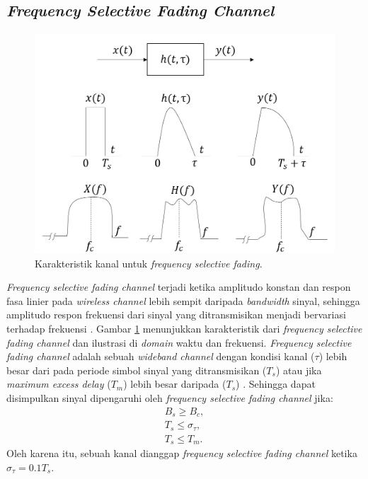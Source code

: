 \subsection{\textit{Frequency Selective Fading Channel}}
\begin{figure}[tb]
	\centering
	\includegraphics[scale=0.7]
	{pics/fadi.jpg}
	\caption{Karakteristik kanal untuk \textit{frequency selective fading}.}
	\label{fig:Frequency Selective Fading Channel}
\end{figure}
\textit{Frequency selective fading channel} terjadi ketika amplitudo konstan dan respon fasa linier pada \textit{wireless channel} lebih sempit daripada \textit{bandwidth} sinyal, sehingga amplitudo respon frekuensi dari sinyal yang ditransmisikan menjadi bervariasi terhadap frekuensi \cite{fading1}. Gambar \ref{fig:Frequency Selective Fading Channel} menunjukkan karakteristik dari \textit{frequency selective fading channel} dan ilustrasi di \textit{domain} waktu dan frekuensi. 
\textit{Frequency selective fading channel} adalah sebuah \textit{wideband channel} dengan kondisi kanal ($\tau$) lebih besar dari pada periode simbol sinyal yang ditransmisikan ($T_{s}$) atau jika \textit{maximum excess delay} ($T_{m}$) lebih besar daripada ($T_{s}$) \cite{fading2}. Sehingga dapat disimpulkan sinyal dipengaruhi oleh \textit{frequency selective fading channel} jika:
\begin{eqnarray}
B_{s} \geq B_{c},  \nonumber \\ 
 T_{s} \leq \sigma_{\tau}, \nonumber \\ 
T_{s} \leq T_{m}. 
\label{eq:Kondisi Frequency Selective Fading Channel}
\end{eqnarray}
\noindent Oleh karena itu, sebuah kanal dianggap \textit{frequency selective fading channel} ketika $\sigma_{\tau} = 0.1 T_{s}$.

